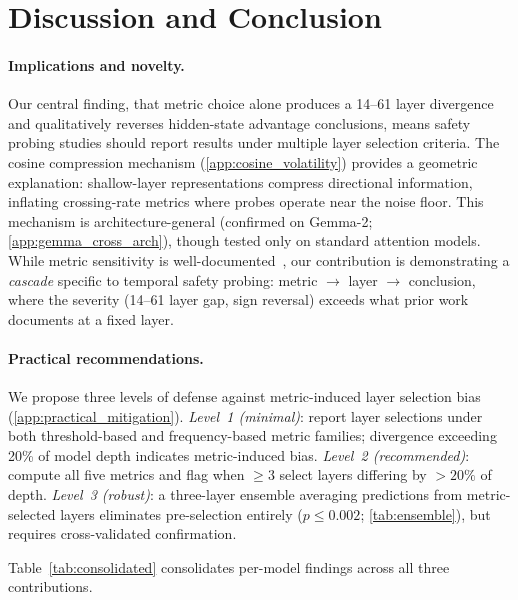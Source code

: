 \section{Discussion and Conclusion}\label{sec:discussion}

\paragraph{Implications and novelty.} Our central finding, that metric choice alone produces a 14--61 layer divergence and qualitatively reverses hidden-state advantage conclusions, means safety probing studies should report results under multiple layer selection criteria. The cosine compression mechanism (\cref{app:cosine_volatility}) provides a geometric explanation: shallow-layer representations compress directional information, inflating crossing-rate metrics where probes operate near the noise floor. This mechanism is architecture-general (confirmed on Gemma-2; \cref{app:gemma_cross_arch}), though tested only on standard attention models. While metric sensitivity is well-documented~\citep{belinkov2022probing,voita2020information}, our contribution is demonstrating a \emph{cascade} specific to temporal safety probing: metric $\to$ layer $\to$ conclusion, where the severity (14--61 layer gap, sign reversal) exceeds what prior work documents at a fixed layer.

\paragraph{Practical recommendations.} We propose three levels of defense against metric-induced layer selection bias (\cref{app:practical_mitigation}). \emph{Level~1 (minimal)}: report layer selections under both threshold-based and frequency-based metric families; divergence exceeding 20\% of model depth indicates metric-induced bias. \emph{Level~2 (recommended)}: compute all five metrics and flag when ${\geq}3$ select layers differing by ${>}20\%$ of depth. \emph{Level~3 (robust)}: a three-layer ensemble averaging predictions from metric-selected layers eliminates pre-selection entirely ($p \leq 0.002$; \cref{tab:ensemble}), but requires cross-validated confirmation.

Table~\ref{tab:consolidated} consolidates per-model findings across all three contributions.


